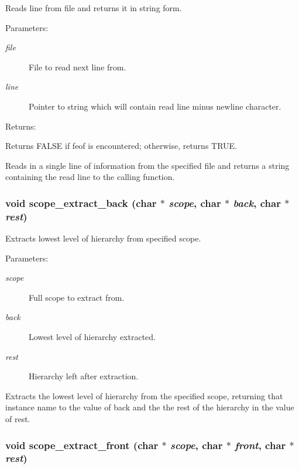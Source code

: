 Reads line from file and returns it in string form.

\begin{Desc}
\item[Parameters: ]\par
\begin{description}
\item[{\em 
file}]File to read next line from. \item[{\em 
line}]Pointer to string which will contain read line minus newline character.\end{description}
\end{Desc}
\begin{Desc}
\item[Returns: ]\par
Returns FALSE if feof is encountered; otherwise, returns TRUE.\end{Desc}
Reads in a single line of information from the specified file and returns a string containing the read line to the calling function. 
\subsubsection{\setlength{\rightskip}{0pt plus 5cm}void scope\_\-extract\_\-back (char $\ast$ {\em scope}, char $\ast$ {\em back}, char $\ast$ {\em rest})}\label{util_8c_a11}


Extracts lowest level of hierarchy from specified scope.

\begin{Desc}
\item[Parameters: ]\par
\begin{description}
\item[{\em 
scope}]Full scope to extract from. \item[{\em 
back}]Lowest level of hierarchy extracted. \item[{\em 
rest}]Hierarchy left after extraction.\end{description}
\end{Desc}
Extracts the lowest level of hierarchy from the specified scope, returning that instance name to the value of back and the the rest of the hierarchy in the value of rest. 
\subsubsection{\setlength{\rightskip}{0pt plus 5cm}void scope\_\-extract\_\-front (char $\ast$ {\em scope}, char $\ast$ {\em front}, char $\ast$ {\em rest})}\label{util_8c_a10}


